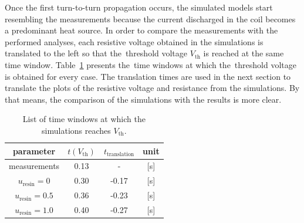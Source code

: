 Once the first turn-to-turn propagation occurs, the simulated models start resembling the measurements because the current discharged in the coil becomes a predominant heat source. In order to compare the measurements with the performed analyses, each resistive voltage obtained in the simulations is translated to the left so that the~threshold voltage $V_\text{th}$ is reached at the same time window. Table~\ref{table: skew_quad_v_res_q_det} presents the~time windows at which the~threshold voltage is obtained for every case. The translation times are used in the next section to translate the plots of the resistive  voltage and resistance from the simulations. By that means, the comparison of the simulations with the results is more clear. 

\begin{table}[H]
    \caption{List of time windows at which the simulations reaches $V_\text{th}$.} 
    \vspace{-1.em} 
    \fontsize{10}{10}
    \selectfont 
    \renewcommand{\arraystretch}{1.5}
    \begin{center}
        \begin{tabular}{ cccc }  
        \hline
        parameter & $t(V_\text{th})$ & $t_\text{translation}$ & unit \\
        \hline
        measurements & 0.13 & - & [s] \\
        $u_\text{resin}=0$ & 0.30 & -0.17 & [s] \\
        $u_\text{resin}=0.5$ & 0.36 & -0.23 & [s] \\
        $u_\text{resin}=1.0$ & 0.40 & -0.27 & [s] \\
        \hline 
        \end{tabular}
    \end{center}  
     \label{table: skew_quad_v_res_q_det} 
 \end{table}